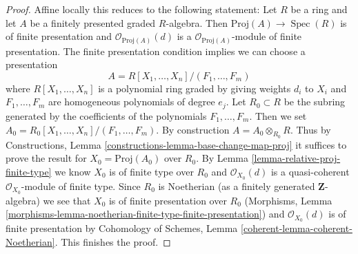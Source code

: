 \documentclass[10pt,a4paper]{amsart}
\theoremstyle{plain}
\theoremstyle{definition}
\theoremstyle{remark}
\numberwithin{equation}{subsection}
\def\Spec{\mathop{\mathrm{Spec}}}
\begin{document}
\begin{proof}
Affine locally this reduces to the following statement:
Let $R$ be a ring and let $A$ be a finitely presented graded $R$-algebra.
Then $\text{Proj}(A) \to \Spec(R)$ is of finite presentation
and $\mathcal{O}_{\text{Proj}(A)}(d)$ is a
$\mathcal{O}_{\text{Proj}(A)}$-module of finite presentation.
The finite presentation condition implies we can choose
a presentation
$$
A = R[X_1, \ldots, X_n]/(F_1, \ldots, F_m)
$$
where $R[X_1, \ldots, X_n]$ is a polynomial ring graded by giving
weights $d_i$ to $X_i$ and $F_1, \ldots, F_m$ are homogeneous polynomials
of degree $e_j$. Let $R_0 \subset R$ be the subring generated by
the coefficients of the polynomials $F_1, \ldots, F_m$.
Then we set $A_0 = R_0[X_1, \ldots, X_n]/(F_1, \ldots, F_m)$.
By construction $A = A_0 \otimes_{R_0} R$.
Thus by
Constructions, Lemma \ref{constructions-lemma-base-change-map-proj}
it suffices to prove the result for $X_0 = \text{Proj}(A_0)$ over $R_0$.
By Lemma \ref{lemma-relative-proj-finite-type}
we know $X_0$ is of finite type over $R_0$ and
$\mathcal{O}_{X_0}(d)$ is a quasi-coherent $\mathcal{O}_{X_0}$-module
of finite type.
Since $R_0$ is Noetherian (as a finitely generated $\mathbf{Z}$-algebra)
we see that $X_0$ is of finite presentation over $R_0$
(Morphisms, Lemma
\ref{morphisms-lemma-noetherian-finite-type-finite-presentation})
and $\mathcal{O}_{X_0}(d)$ is of finite presentation by
Cohomology of Schemes, Lemma \ref{coherent-lemma-coherent-Noetherian}.
This finishes the proof.
\end{proof}
\end{document}
